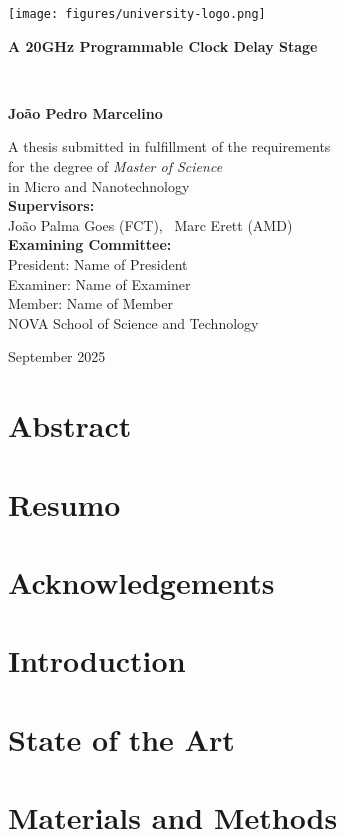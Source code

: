 \documentclass[11pt, a4paper]{report}
\newcommand{\importsection}[1]{}
\newcommand{\frontpage}{
    \begin{titlepage}
        \centering
        \texttt{[image: figures/university-logo.png]}\\ %
        \vspace{2cm}
        {\Huge\bfseries A 20GHz Programmable Clock Delay Stage\par}\
        \centering
        \vspace{1.5cm}
        {\Large\bfseries João Pedro Marcelino\par}
        \vfill
        A thesis submitted in fulfillment of the requirements\\
        for the degree of \emph{Master of Science}\\
        in Micro and Nanotechnology\\
        \vspace{2cm}
        {\bfseries Supervisors:}\\[0.5em]
        João Palma Goes (FCT), \
        Marc Erett (AMD)\\[2cm]
        {\bfseries Examining Committee:}\\[0.5em]
        President: Name of President\\
        Examiner: Name of Examiner\\
        Member: Name of Member\\[2cm]
        NOVA School of Science and Technology\\
        \vspace{1cm}
        {\large September 2025\par}
    \end{titlepage}
}
\newcommand{\copyrightpage}{
    \thispagestyle{empty}
    \vspace*{0.1\textheight} %
    \importsection{copyright} %
    \cleardoublepage
}
\begin{document}



\frontpage%
\thispagestyle{empty}

\copyrightpage


\chapter*{Abstract}
\importsection{abstract} %
\cleardoublepage %

\chapter*{Resumo}
\importsection{resumo} %
\cleardoublepage %

\chapter*{Acknowledgements}
\importsection{acknowledgements}


\tableofcontents
\cleardoublepage

\listoffigures
\cleardoublepage

\listoftables
\cleardoublepage
{}


\setcounter{page}{1}

\chapter{Introduction}
\importsection{introduction}
\cleardoublepage

\chapter{State of the Art}
\importsection{stateoftheart}
\cleardoublepage

\chapter{Materials and Methods}
\importsection{methods}
\cleardoublepage
\end{document}
